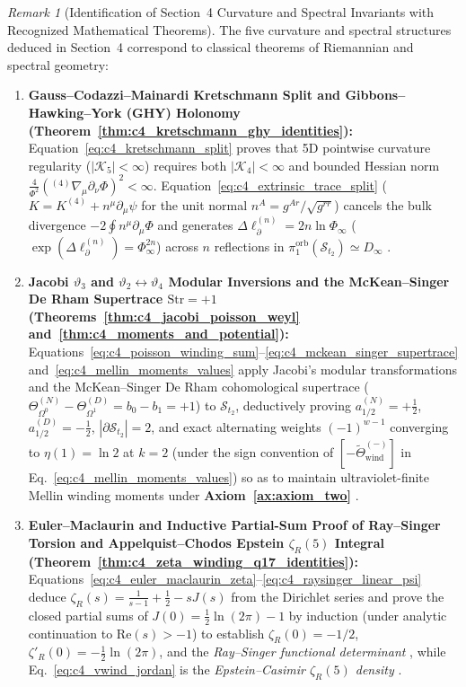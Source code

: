 \documentclass[11pt,a4paper]{article}
\newcommand{\catD}{\text{\textbf{\textcolor{blue!75!black}{[D]}}}}
\theoremstyle{definition}
\theoremstyle{plain}
\theoremstyle{remark}
\newtheorem{remark}[axiom]{Remark}
\begin{document}
\begin{remark}[Identification of Section~4 Curvature and Spectral Invariants with Recognized Mathematical Theorems]\label{rem:c4_master_recognition}
The five curvature and spectral structures deduced in Section~4 correspond to classical theorems of Riemannian and spectral geometry:
\begin{enumerate}[label=\arabic*.]
  \item \textbf{Gauss--Codazzi--Mainardi Kretschmann Split and Gibbons--Hawking--York (GHY) Holonomy (Theorem~\ref{thm:c4_kretschmann_ghy_identities}):} Equation~\eqref{eq:c4_kretschmann_split} proves that 5D pointwise curvature regularity ($|\mathcal{K}_5| < \infty$) requires both $|\mathcal{K}_4| < \infty$ and bounded Hessian norm $\frac{4}{\Phi^2}({}^{(4)}\nabla_\mu\partial_\nu\Phi)^2 < \infty$. Equation~\eqref{eq:c4_extrinsic_trace_split} ($K = K^{(4)} + n^\mu\partial_\mu\psi$ for the unit normal $n^A = g^{Ar}/\sqrt{g^{rr}}$) cancels the bulk divergence $-2\oint n^\mu\partial_\mu\Phi$ and generates $\Delta\ell_\partial^{(n)} = 2n\ln\Phi_\infty$ ($\exp(\Delta\ell_\partial^{(n)}) = \Phi_\infty^{2n}$) across $n$ reflections in $\pi_1^{\mathrm{orb}}(\mathcal{S}_{t_2}) \simeq D_\infty$ \catD.
  \item \textbf{Jacobi $\vartheta_3$ and $\vartheta_2 \leftrightarrow \vartheta_4$ Modular Inversions and the McKean--Singer De Rham Supertrace $\mathrm{Str} = +1$ (Theorems~\ref{thm:c4_jacobi_poisson_weyl} and~\ref{thm:c4_moments_and_potential}):} Equations~\eqref{eq:c4_poisson_winding_sum}--\eqref{eq:c4_mckean_singer_supertrace} and~\eqref{eq:c4_mellin_moments_values} apply Jacobi's modular transformations and the McKean--Singer De Rham cohomological supertrace \cite{McKeanSinger1967} ($\Theta_{\Omega^0}^{(N)} - \Theta_{\Omega^1}^{(D)} = b_0 - b_1 = +1$) to $\mathcal{S}_{t_2}$, deductively proving $a_{1/2}^{(N)} = +\frac{1}{2}$, $a_{1/2}^{(D)} = -\frac{1}{2}$, $|\partial\mathcal{S}_{t_2}| = 2$, and exact alternating weights $(-1)^{w-1}$ converging to $\eta(1) = \ln 2$ at $k = 2$ (under the sign convention of $[-\widetilde{\Theta}_{\mathrm{wind}}^{(-)}]$ in Eq.~\eqref{eq:c4_mellin_moments_values}) so as to maintain ultraviolet-finite Mellin winding moments under \textbf{Axiom~\ref{ax:axiom_two}} \catD.
  \item \textbf{Euler--Maclaurin and Inductive Partial-Sum Proof of Ray--Singer Torsion and Appelquist--Chodos Epstein $\zeta_R(5)$ Integral (Theorem~\ref{thm:c4_zeta_winding_q17_identities}):} Equations~\eqref{eq:c4_euler_maclaurin_zeta}--\eqref{eq:c4_raysinger_linear_psi} deduce $\zeta_R(s) = \frac{1}{s-1} + \frac{1}{2} - s J(s)$ from the Dirichlet series and prove the closed partial sums of $J(0) = \frac{1}{2}\ln(2\pi) - 1$ by induction (under analytic continuation to $\mathrm{Re}(s) > -1$) to establish $\zeta_R(0)=-1/2$, $\zeta'_R(0)=-\frac{1}{2}\ln(2\pi)$, and the \emph{Ray--Singer functional determinant} \cite{RaySinger1971}, while Eq.~\eqref{eq:c4_vwind_jordan} is the \emph{Epstein--Casimir $\zeta_R(5)$ density} \cite{AppelquistChodos1983} \catD.

\end{enumerate}
\end{remark}
\end{document}
